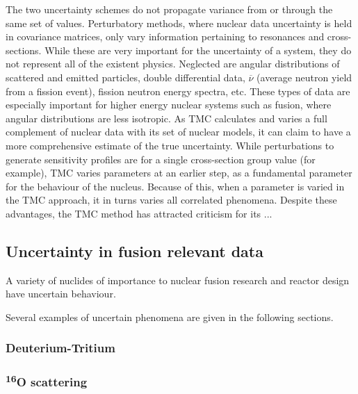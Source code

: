 The two uncertainty schemes do not propagate variance from or through the same set of values. Perturbatory methods, where nuclear data uncertainty is held in covariance matrices, only vary information pertaining to resonances and cross-sections. While these are very important for the uncertainty of a system, they do not represent all of the existent physics. Neglected are angular distributions of scattered and emitted particles, double differential data, $\overline{\nu}$ (average neutron yield from a fission event), fission neutron energy spectra, etc. These types of data are especially important for higher energy nuclear systems such as fusion, where angular distributions are less isotropic. As TMC calculates and varies a full complement of nuclear data with its set of nuclear models, it can claim to have a more comprehensive estimate of the true uncertainty. While perturbations to generate sensitivity profiles are for a single cross-section group value (for example), TMC varies parameters at an earlier step, as a fundamental parameter for the behaviour of the nucleus. Because of this, when a parameter is varied in the TMC approach, it in turns varies all correlated phenomena. Despite these advantages, the TMC method has attracted criticism for its ... \cite{Koning2015a} \cite{Helgesson2017}



\FloatBarrier
\subsection{Uncertainty in fusion relevant data}
A variety of nuclides of importance to nuclear fusion research and reactor design have uncertain behaviour. 

\cite{Forrest2011}
Several examples of uncertain phenomena are given in the following sections.

\subsubsection{Deuterium-Tritium}
\subsubsection{\textsuperscript{16}O scattering}
